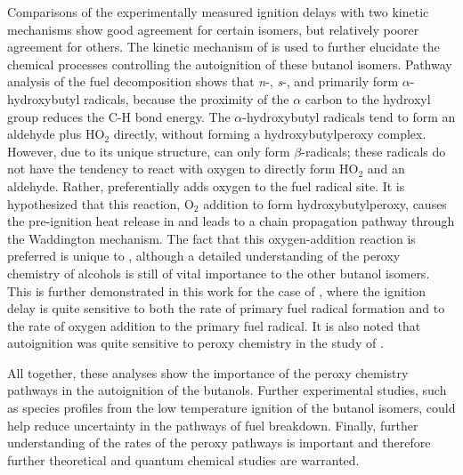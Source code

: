 \documentclass[../main.tex]{subfiles}
\begin{document}
Comparisons of the experimentally measured ignition delays with two kinetic
mechanisms show good agreement for certain isomers, but relatively poorer
agreement for others. The kinetic mechanism of \textcite{Sarathy2012} is used
to further elucidate the chemical processes controlling the autoignition of
these butanol isomers. Pathway analysis of the fuel decomposition shows that
\textit{n}-, \textit{s}-, and \iBuOH{} primarily form
$\alpha$-hydroxybutyl radicals, because the proximity of the $\alpha$ carbon to
the hydroxyl group reduces the C-H bond energy. The $\alpha$-hydroxybutyl radicals
tend to form an aldehyde plus HO$_2$  directly, without forming a
hydroxybutylperoxy complex. However, due to its unique structure,
\tBuOH{} can only form $\beta$-radicals; these radicals do not have
the tendency to react with oxygen to directly form HO$_2$  and an aldehyde.
Rather, \tBuOH{} preferentially adds oxygen to the fuel radical site.
It is hypothesized that this reaction, O$_2$  addition to form
hydroxybutylperoxy, causes the pre-ignition heat release in \tBuOH{}
and leads to a chain propagation pathway through the Waddington mechanism. The
fact that this oxygen-addition reaction is preferred is unique to
\tBuOH{}, although a detailed understanding of the peroxy chemistry
of alcohols is still of vital importance to the other butanol isomers. This is
further demonstrated in this work for the case of \iBuOH{}, where the
ignition delay is quite sensitive to both the rate of primary fuel
radical formation and to the rate of oxygen addition to the primary fuel
radical. It is also noted that \nBuOH{} autoignition was
quite sensitive to peroxy chemistry in the study of \textcite{Vranckx2011}.

All together, these analyses show the importance of the peroxy chemistry
pathways in the autoignition of the butanols. Further experimental studies,
such as species profiles from the low temperature ignition of the butanol
isomers, could help reduce uncertainty in the pathways of fuel breakdown.
Finally, further understanding of the rates of the peroxy pathways is
important and therefore further theoretical and quantum chemical studies are
warranted.
\end{document}
